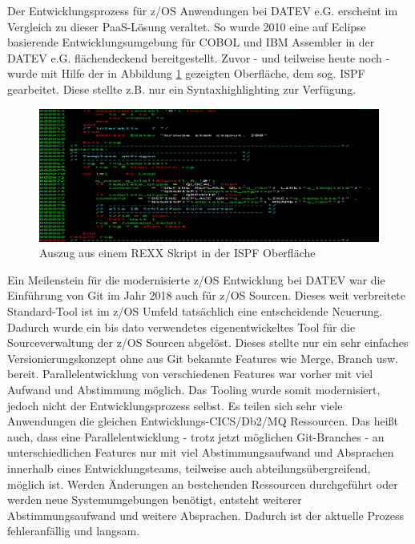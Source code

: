 Der Entwicklungsprozess für z/OS Anwendungen bei DATEV e.G. erscheint im Vergleich zu dieser PaaS-Lösung veraltet.
So wurde 2010 eine auf Eclipse basierende Entwicklungsumgebung für COBOL und IBM Assembler in der DATEV e.G. flächendeckend bereitgestellt.
Zuvor - und teilweise heute noch -  wurde mit Hilfe der in Abbildung \ref{fig:3270} gezeigten Oberfläche, dem sog. ISPF gearbeitet.
Diese stellte z.B. nur ein Syntaxhighlighting zur Verfügung.
\begin{figure}[h]
\centering
\includegraphics[width=\textwidth]{figures/rexxintso.png}
\caption{Auszug aus einem REXX Skript in der ISPF Oberfläche}
\label{fig:3270}
\end{figure}
Ein Meilenstein für die modernisierte z/OS Entwicklung bei DATEV war die Einführung von Git im Jahr 2018 auch für z/OS Sourcen. 
Dieses weit verbreitete Standard-Tool ist im z/OS Umfeld tatsächlich eine entscheidende Neuerung.
Dadurch wurde ein bis dato verwendetes eigenentwickeltes Tool für die Sourceverwaltung der z/OS Sourcen abgelöst.
Dieses stellte nur ein sehr einfaches Versionierungskonzept ohne aus Git bekannte Features wie Merge, Branch usw. bereit. 
Parallelentwicklung von verschiedenen Features war vorher mit viel Aufwand und Abstimmung möglich. 
Das Tooling wurde somit modernisiert, jedoch nicht der Entwicklungsprozess selbst.
Es teilen sich sehr viele Anwendungen die gleichen Entwicklungs-CICS/Db2/MQ Ressourcen.
Das heißt auch, dass eine Parallelentwicklung - trotz jetzt möglichen Git-Branches - an unterschiedlichen Features nur mit viel Abstimmungsaufwand und Absprachen innerhalb eines Entwicklungsteams, teilweise auch abteilungsübergreifend, möglich ist.
Werden Änderungen an bestehenden Ressourcen durchgeführt oder werden neue Systemumgebungen benötigt, entsteht weiterer Abstimmungsaufwand und weitere Absprachen.
Dadurch ist der aktuelle Prozess fehleranfällig und langsam.

